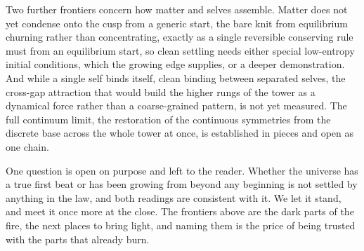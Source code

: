 Two further frontiers concern how matter and selves assemble. Matter does not yet condense onto the cusp from a generic start, the bare knit from equilibrium churning rather than concentrating, exactly as a single reversible conserving rule must from an equilibrium start, so clean settling needs either special low-entropy initial conditions, which the growing edge supplies, or a deeper demonstration. And while a single self binds itself, clean binding between separated selves, the cross-gap attraction that would build the higher rungs of the tower as a dynamical force rather than a coarse-grained pattern, is not yet measured. The full continuum limit, the restoration of the continuous symmetries from the discrete base across the whole tower at once, is established in pieces and open as one chain.

One question is open on purpose and left to the reader. Whether the universe has a true first beat or has been growing from beyond any beginning is not settled by anything in the law, and both readings are consistent with it. We let it stand, and meet it once more at the close. The frontiers above are the dark parts of the fire, the next places to bring light, and naming them is the price of being trusted with the parts that already burn.
